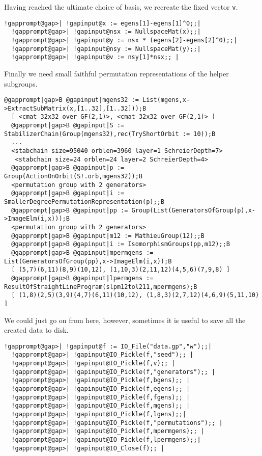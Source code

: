 \documentclass[a4paper,11pt]{report}
\begin{document}
{{ Having reached the ultimate choice of basis, we recreate the fixed vector \texttt{v}. 
\begin{Verbatim}[commandchars=!@|,fontsize=\small,frame=single,label=Example]
  !gapprompt@gap>| !gapinput@x := egens[1]-egens[1]^0;;|
  !gapprompt@gap>| !gapinput@nsx := NullspaceMat(x);;|
  !gapprompt@gap>| !gapinput@y := nsx * (egens[2]-egens[2]^0);;|
  !gapprompt@gap>| !gapinput@nsy := NullspaceMat(y);;|
  !gapprompt@gap>| !gapinput@v := nsy[1]*nsx;; |
\end{Verbatim}
 

 Finally we need small faithful permutation representations of the helper
subgroups. 
\begin{Verbatim}[commandchars=@|B,fontsize=\small,frame=single,label=Example]
  @gapprompt|gap>B @gapinput|mgens32 := List(mgens,x->ExtractSubMatrix(x,[1..32],[1..32]));B
  [ <cmat 32x32 over GF(2,1)>, <cmat 32x32 over GF(2,1)> ]
  @gapprompt|gap>B @gapinput|S := StabilizerChain(Group(mgens32),rec(TryShortOrbit := 10));B
  ...
  <stabchain size=95040 orblen=3960 layer=1 SchreierDepth=7>
   <stabchain size=24 orblen=24 layer=2 SchreierDepth=4>
  @gapprompt|gap>B @gapinput|p := Group(ActionOnOrbit(S!.orb,mgens32));B
  <permutation group with 2 generators>
  @gapprompt|gap>B @gapinput|i := SmallerDegreePermutationRepresentation(p);;B
  @gapprompt|gap>B @gapinput|pp := Group(List(GeneratorsOfGroup(p),x->ImageElm(i,x)));B
  <permutation group with 2 generators>
  @gapprompt|gap>B @gapinput|m12 := MathieuGroup(12);;B
  @gapprompt|gap>B @gapinput|i := IsomorphismGroups(pp,m12);;B
  @gapprompt|gap>B @gapinput|mpermgens := List(GeneratorsOfGroup(pp),x->ImageElm(i,x));B
  [ (5,7)(6,11)(8,9)(10,12), (1,10,3)(2,11,12)(4,5,6)(7,9,8) ]
  @gapprompt|gap>B @gapinput|lpermgens := ResultOfStraightLineProgram(slpm12tol211,mpermgens);B
  [ (1,8)(2,5)(3,9)(4,7)(6,11)(10,12), (1,8,3)(2,7,12)(4,6,9)(5,11,10) ] 
\end{Verbatim}
 

 We could just go on from here, however, sometimes it is useful to save all the
created data to disk. 
\begin{Verbatim}[commandchars=!@|,fontsize=\small,frame=single,label=Example]
  !gapprompt@gap>| !gapinput@f := IO_File("data.gp","w");;|
  !gapprompt@gap>| !gapinput@IO_Pickle(f,"seed");; |
  !gapprompt@gap>| !gapinput@IO_Pickle(f,v);; |
  !gapprompt@gap>| !gapinput@IO_Pickle(f,"generators");; |
  !gapprompt@gap>| !gapinput@IO_Pickle(f,bgens);; |
  !gapprompt@gap>| !gapinput@IO_Pickle(f,egens);; |
  !gapprompt@gap>| !gapinput@IO_Pickle(f,fgens);; |
  !gapprompt@gap>| !gapinput@IO_Pickle(f,mgens);; |
  !gapprompt@gap>| !gapinput@IO_Pickle(f,lgens);;|
  !gapprompt@gap>| !gapinput@IO_Pickle(f,"permutations");; |
  !gapprompt@gap>| !gapinput@IO_Pickle(f,mpermgens);; |
  !gapprompt@gap>| !gapinput@IO_Pickle(f,lpermgens);;|
  !gapprompt@gap>| !gapinput@IO_Close(f);; |
\end{Verbatim}
 

}}
\end{document}
